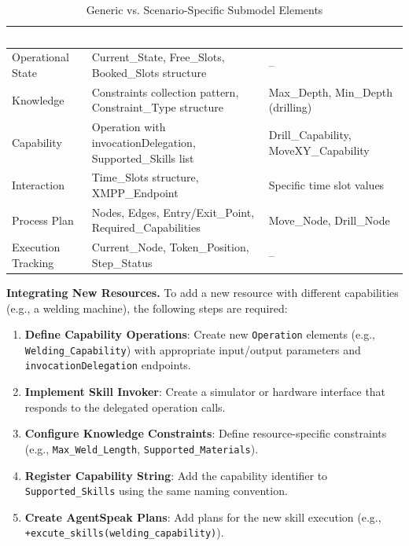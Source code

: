 \begin{table}[ht]
\centering
\caption{Generic vs. Scenario-Specific Submodel Elements}
\label{tab:generic_specific}
\begin{tabular}{p{}p{}p{}}
\toprule
\rowcolor{headerblue}
\textcolor{white}{Submodel} & \textcolor{white}{Generic (Reusable)} & \textcolor{white}{Scenario-Specific} \\
\midrule
Operational State & Current\_State, Free\_Slots, Booked\_Slots structure & -- \\
\rowcolor{lightgray}
Knowledge & Constraints collection pattern, Constraint\_Type structure & Max\_Depth, Min\_Depth (drilling) \\
Capability & Operation with invocationDelegation, Supported\_Skills list & Drill\_Capability, MoveXY\_Capability \\
\rowcolor{lightgray}
Interaction & Time\_Slots structure, XMPP\_Endpoint & Specific time slot values \\
Process Plan & Nodes, Edges, Entry/Exit\_Point, Required\_Capabilities & Move\_Node, Drill\_Node \\
\rowcolor{lightgray}
Execution Tracking & Current\_Node, Token\_Position, Step\_Status & -- \\
\bottomrule
\end{tabular}
\end{table}
\textbf{Integrating New Resources.} To add a new resource with different capabilities (e.g., a welding machine), the following steps are required:

\begin{enumerate}
    \item \textbf{Define Capability Operations}: Create new \texttt{Operation} elements (e.g., \texttt{Welding\_Capability}) with appropriate input/output parameters and \texttt{invocationDelegation} endpoints.
    
    \item \textbf{Implement Skill Invoker}: Create a simulator or hardware interface that responds to the delegated operation calls.
    
    \item \textbf{Configure Knowledge Constraints}: Define resource-specific constraints (e.g., \texttt{Max\_Weld\_Length}, \texttt{Supported\_Materials}).
    
    \item \textbf{Register Capability String}: Add the capability identifier to \texttt{Supported\_Skills} using the same naming convention.
    
    \item \textbf{Create AgentSpeak Plans}: Add plans for the new skill execution (e.g., \texttt{+excute\_skills(welding\_capability)}).
\end{enumerate}

